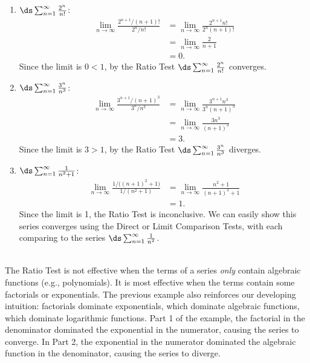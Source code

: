 {\begin{enumerate}
	\item $\ds \sum_{n=1}^\infty \frac{2^n}{n!}$:
	\begin{align*}
	\lim_{n\to\infty}\frac{2^{n+1}/(n+1)!}{2^n/n!} &= \lim_{n\to\infty} \frac{2^{n+1}n!}{2^n(n+1)!}\\
				&= \lim_{n\to\infty} \frac{2}{n+1}\\
				&=0.
	\end{align*}
	Since the limit is $0<1$, by the Ratio Test $\ds\sum_{n=1}^\infty \frac{2^n}{n!}$ converges.
	
	\item	$\ds\sum_{n=1}^\infty \frac{3^n}{n^3}$:
	\begin{align*}
	\lim_{n\to\infty} \frac{3^{n+1}/(n+1)^3}{3^n/n^3} &= \lim_{n\to\infty}\frac{3^{n+1}n^3}{3^n(n+1)^3}\\
				&= \lim_{n\to\infty} \frac{3n^3}{(n+1)^3}\\
				&= 3.
	\end{align*}
	Since the limit is $3>1$, by the Ratio Test $\ds\sum_{n=1}^\infty \frac{3^n}{n^3}$ diverges.
	
	\item  $\ds\sum_{n=1}^\infty \frac{1}{n^2+1}$:
	\begin{align*}
	\lim_{n\to\infty} \frac{1/\big((n+1)^2+1\big)}{1/(n^2+1)} &= \lim_{n\to\infty} \frac{n^2+1}{(n+1)^2+1}\\
				&= 1.
	\end{align*}
	Since the limit is 1, the Ratio Test is inconclusive. We can easily show this series converges using the Direct or Limit Comparison Tests, with each comparing to the series $\ds \sum_{n=1}^\infty \frac{1}{n^2}$.
\end{enumerate}
}\\

The Ratio Test is not effective when the terms of a series \textit{only} contain algebraic functions (e.g., polynomials). It is most effective when the terms contain some factorials or exponentials. The previous example also reinforces our developing intuition: factorials dominate exponentials, which dominate algebraic functions, which dominate logarithmic functions. Part 1 of the example, the factorial in the denominator dominated the exponential in the numerator, causing the series to converge. In Part 2, the exponential in the numerator dominated the algebraic function in the denominator, causing the series to diverge.


